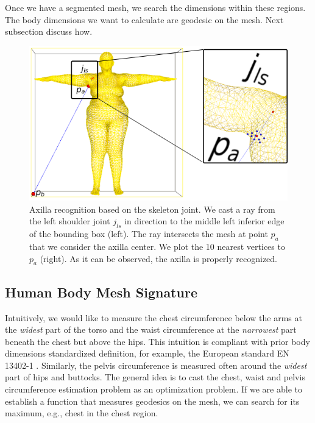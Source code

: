 \documentclass[runningheads, orivec]{llncs}
\begin{document}
Once we have a segmented mesh, we search the dimensions within 
these regions. The body dimensions we want to calculate are 
geodesic on the mesh. Next subsection discuss how.

\begin{figure}[H]
	\begin{center}
		\includegraphics[width=\linewidth]{axilla_recognition_final.png}
	\end{center}
	\caption{Axilla recognition based on the skeleton joint. We cast a ray from 
	the left shoulder joint $j_{ls}$ in direction to the middle left 
		inferior edge of the bounding box (left). The ray intersects the mesh 
		at point $p_a$ that we consider the axilla center. We plot the 10 
		nearest vertices to $p_a$ (right). As it can be observed, the axilla is 
		properly recognized.}
	\label{fig:axilla-recognition}
\end{figure}

\subsection{Human Body Mesh Signature}\label{subsec:hbm_signature}
Intuitively, we would like to measure the chest circumference below the arms 
at the \textit{widest} part of the torso and the waist circumference at the 
\textit{narrowest} part beneath the chest but above the hips. This intuition is 
compliant 
with prior body dimensions standardized definition, for example, the European 
standard EN 13402-1 \cite{en13402-1}. Similarly, the pelvis 
circumference is measured often around the \textit{widest} part of hips and 
buttocks. The general idea is to cast the chest, waist and pelvis circumference 
estimation problem as an optimization problem. If we are able to establish a 
function that measures geodesics on the mesh, we can search for its maximum, 
e.g., chest in the chest region.
\end{document}
